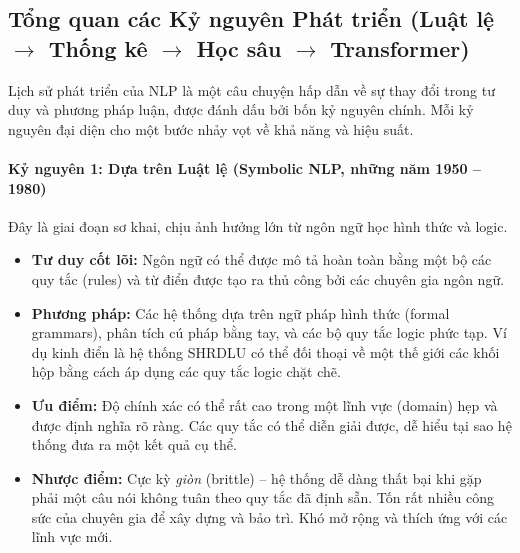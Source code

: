 \subsection{Tổng quan các Kỷ nguyên Phát triển (Luật lệ \(\rightarrow\) Thống kê \(\rightarrow\) Học sâu \(\rightarrow\) Transformer)}
\label{ssec:ky_nguyen_phat_trien}

Lịch sử phát triển của NLP là một câu chuyện hấp dẫn về sự thay đổi trong tư duy và phương pháp luận, được đánh dấu bởi bốn kỷ nguyên chính. Mỗi kỷ nguyên đại diện cho một bước nhảy vọt về khả năng và hiệu suất.

\paragraph{Kỷ nguyên 1: Dựa trên Luật lệ (Symbolic NLP, những năm 1950 -- 1980)}
Đây là giai đoạn sơ khai, chịu ảnh hưởng lớn từ ngôn ngữ học hình thức và logic.
\begin{itemize}
    \item \textbf{Tư duy cốt lõi:} Ngôn ngữ có thể được mô tả hoàn toàn bằng một bộ các quy tắc (rules) và từ điển được tạo ra thủ công bởi các chuyên gia ngôn ngữ.
    \item \textbf{Phương pháp:} Các hệ thống dựa trên ngữ pháp hình thức (formal grammars), phân tích cú pháp bằng tay, và các bộ quy tắc logic phức tạp. Ví dụ kinh điển là hệ thống SHRDLU \cite{winograd1972understanding} có thể đối thoại về một thế giới các khối hộp bằng cách áp dụng các quy tắc logic chặt chẽ.
    \item \textbf{Ưu điểm:} Độ chính xác có thể rất cao trong một lĩnh vực (domain) hẹp và được định nghĩa rõ ràng. Các quy tắc có thể diễn giải được, dễ hiểu tại sao hệ thống đưa ra một kết quả cụ thể.
    \item \textbf{Nhược điểm:} Cực kỳ \textit{giòn} (brittle) -- hệ thống dễ dàng thất bại khi gặp phải một câu nói không tuân theo quy tắc đã định sẵn. Tốn rất nhiều công sức của chuyên gia để xây dựng và bảo trì. Khó mở rộng và thích ứng với các lĩnh vực mới.
\end{itemize}

